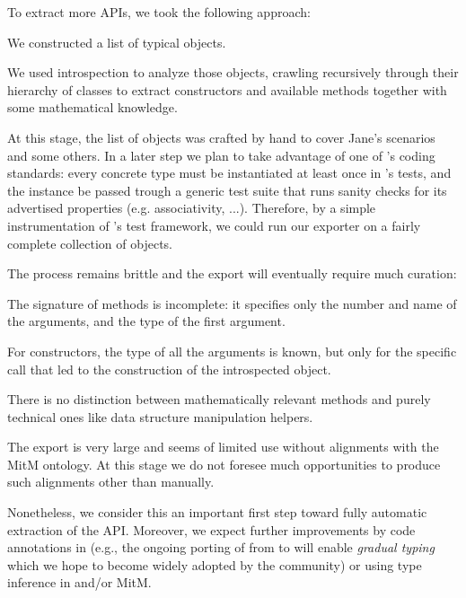 To extract more APIs, we took the following approach:
\begin{compactenum}
\item We constructed a list of typical \Sage objects.
\item We used introspection to analyze those objects, crawling recursively through their hierarchy of classes to extract constructors and available methods together with some mathematical knowledge.
\end{compactenum}

At this stage, the list of objects was crafted by hand to cover Jane's scenarios and some others.
In a later step we plan to take advantage of one of \Sage's coding standards: every concrete type must be instantiated at least once in \Sage's tests, and the instance be passed
trough a generic test suite that runs sanity checks for its advertised
properties (e.g. associativity, ...).
Therefore, by a simple instrumentation of \Sage's test framework, we could run our exporter on a fairly complete collection of \Sage objects.

The process remains brittle and the export will eventually require much curation:
\begin{compactitem}
\item The signature of methods is incomplete: it specifies only the
  number and name of the arguments, and the type of the first
  argument.
\item For constructors, the type of all the arguments is known, but
  only for the specific call that led to the construction of the
  introspected object.
\item There is no distinction between mathematically relevant methods
  and purely technical ones like data structure manipulation helpers.
\item The export is very large and seems of limited use without
  alignments with the MitM ontology. At this stage we do not foresee
  much opportunities to produce such alignments other than manually.
\end{compactitem}

Nonetheless, we consider this an important first step toward fully automatic extraction of the \Sage API.
Moreover, we expect further improvements by code annotations in \Sage
(e.g., the ongoing porting of \Sage from  to  will enable \emph{gradual typing} which we hope to become widely
adopted by the community) or using type inference in \Sage and/or MitM.

